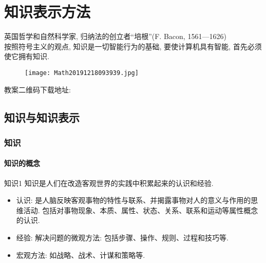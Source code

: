 \chapter{知识表示方法}\label{AIchap2}
\begin{tcolorbox}[colback=white!50,colframe=orange!50,title=知 识 就 是 力 量]
   英国哲学和自然科学家, 归纳法的创立者“培根”(F. Bacon, 1561—1626)\hfill\\
   按照符号主义的观点, 知识是一切智能行为的基础, 要使计算机具有智能, 首先必须使它拥有知识.
\end{tcolorbox}
\begin{figure}[H]
\centering
\texttt{[image: Math20191218093939.jpg]}
\label{Math20191218093939}
\end{figure}
教案二维码下载地址: 
\newpage
\section{知识与知识表示}
\subsection{知识}
\subsubsection{知识的概念}
\begin{mydef}{知识}{1}
知识是人们在改造客观世界的实践中积累起来的认识和经验.
\end{mydef}
\begin{itemize}
\item  认识: 是人脑反映客观事物的特性与联系、并揭露事物对人的意义与作用的思维活动. 包括对事物现象、本质、属性、状态、关系、联系和运动等属性概念的认识.
\item  经验: 解决问题的微观方法: 包括步骤、操作、规则、过程和技巧等.
\item  宏观方法: 如战略、战术、计谋和策略等.
\end{itemize}
